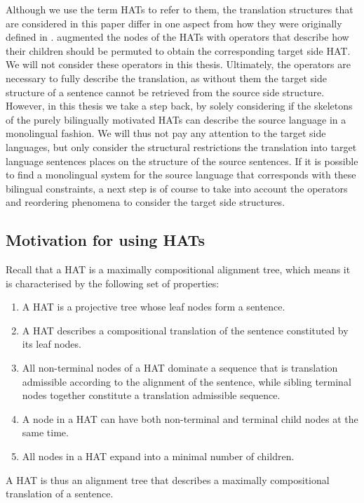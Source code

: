 Although we use the term HATs to refer to them, the translation structures that are considered in this paper differ in one aspect from how they were originally defined in \citep{simaan2013hats}. \citeauthor{simaan2013hats} augmented the nodes of the HATs with operators that describe how their children should be permuted to obtain the corresponding target side HAT. We will not consider these operators in this thesis. Ultimately, the operators are necessary to fully describe the translation, as without them the target side structure of a sentence cannot be retrieved from the source side structure. However, in this thesis we take a step back, by solely considering if the skeletons of the purely bilingually motivated HATs can describe the source language in a monolingual fashion. We will thus not pay any attention to the target side languages, but only consider the structural restrictions the translation into target language sentences places on the structure of the source sentences. If it is possible to find a monolingual system for the source language that corresponds with these bilingual constraints, a next step is of course to take into account the operators and reordering phenomena to consider the target side structures.

\subsection{Motivation for using HATs}

Recall that a HAT is a maximally compositional alignment tree, which means it is characterised by the following set of properties:\begin{enumerate}
\item A HAT is a projective tree whose leaf nodes form a sentence.
\item A HAT describes a compositional translation of the sentence constituted by its leaf nodes.
\item All non-terminal nodes of a HAT dominate a sequence that is translation admissible according to the alignment of the sentence, while sibling terminal nodes together constitute a translation admissible sequence.
\item A node in a HAT can have both non-terminal and terminal child nodes at the same time.
\item All nodes in a HAT expand into a minimal number of children.
\end{enumerate}

\noindent A HAT is thus an alignment tree that describes a maximally compositional translation of a sentence. 

